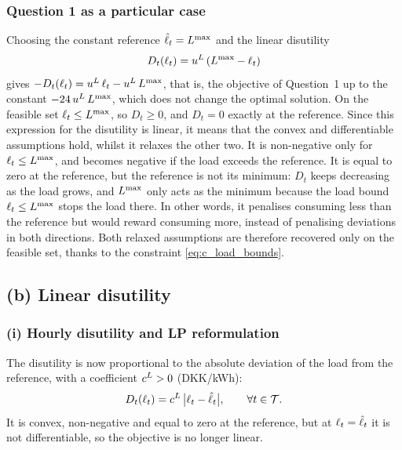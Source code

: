 \subsubsection{Question 1 as a particular case}
Choosing the constant reference $\hat{\ell}_{t} = L^{\max}$ and the linear disutility
\begin{equation}
    D_t(\ell_{t}) = u^{L} \, (L^{\max} - \ell_{t})
\end{equation}
gives $-D_t(\ell_{t}) = u^{L} \, \ell_{t} - u^{L} \, L^{\max}$, that is, the objective of Question~1 up to
the constant $-24 \, u^{L} \, L^{\max}$, which does not change the optimal solution. On the feasible
set $\ell_{t} \leq L^{\max}$, so $D_t \geq 0$, and $D_t = 0$ exactly at the reference. Since this expression for the disutility is linear, it means that the convex and differentiable assumptions hold, whilst it relaxes the other two.
\newline
\newline
It is non-negative only for $\ell_{t} \leq L^{\max}$, and becomes negative if the load exceeds the reference. It is equal to
zero at the reference, but the reference is not its minimum: $D_t$ keeps decreasing as the
load grows, and $L^{\max}$ only acts as the minimum because the load bound
$\ell_{t} \leq L^{\max}$ stops the load there. In other words, it penalises consuming less than
the reference but would reward consuming more, instead of penalising deviations in both
directions. Both relaxed assumptions are therefore recovered only on the feasible set,
thanks to the constraint \eqref{eq:c_load_bounds}.


\subsection{(b) Linear disutility}

\subsubsection{(i) Hourly disutility and LP reformulation}

The disutility is now proportional to the absolute deviation of the load from the reference,
with a coefficient $c^{L} > 0$ (DKK/kWh):
\begin{equation}
    D_t(\ell_{t}) = c^{L} \, \big| \ell_{t} - \hat{\ell}_{t} \big|, \qquad \forall t \in \mathcal{T}.
    \label{eq:q2b_disutility}
\end{equation}
It is convex, non-negative and equal to zero at the reference, but at
$\ell_{t} = \hat{\ell}_{t}$ it is not differentiable, so the objective is no longer linear.

